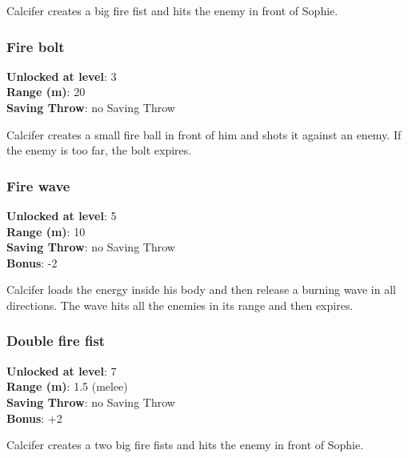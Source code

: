 Calcifer creates a big fire fist and hits the enemy in front of Sophie.

\subsubsection{Fire bolt}
\textbf{Unlocked at level}: 3 \\
\textbf{Range (m)}: 20 \\
\textbf{Saving Throw}: no Saving Throw

Calcifer creates a small fire ball in front of him and shots it against an enemy. If the enemy is too far, the bolt expires.

\subsubsection{Fire wave}
\textbf{Unlocked at level}: 5 \\
\textbf{Range (m)}: 10 \\
\textbf{Saving Throw}: no Saving Throw \\
\textbf{Bonus}: -2

Calcifer loads the energy inside his body and then release a burning wave in all directions. The wave hits all the enemies in its range and then expires.

\subsubsection{Double fire fist}
\textbf{Unlocked at level}: 7 \\
\textbf{Range (m)}: 1.5 (melee) \\
\textbf{Saving Throw}: no Saving Throw \\
\textbf{Bonus}: +2

Calcifer creates a two big fire fists and hits the enemy in front of Sophie.

